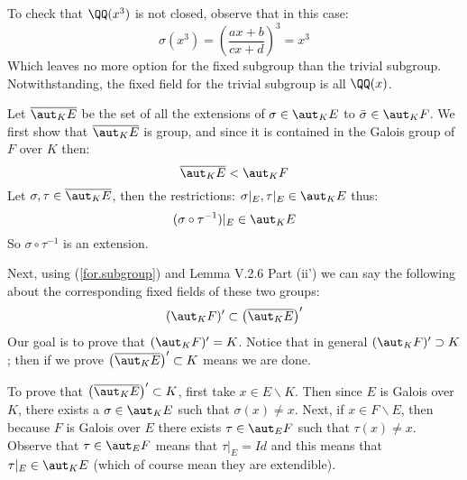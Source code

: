 To check that $\QQ(x^3)$ is not closed, observe that in this case:
$$\sigma(x^3) = \left( \frac{ax+b}{cx+d}\right)^3=x^3$$
Which leaves no more option for the fixed subgroup than the trivial subgroup. Notwithstanding, the fixed field for the trivial subgroup is all $\QQ(x)$.

Let $\overline{\aut_K E}$ be the set of all the extensions of $\sigma\in \aut_KE$ to $\bar\sigma\in \aut_KF$. We first show that $\overline{\aut_K E}$ is group, and since it is contained in the Galois group of $F$ over $K$ then:
\begin{equation}\label{for.subgroup}
\overline{\aut_K E}<\aut_KF
\end{equation}
Let $\sigma, \tau \in \overline{\aut_K E}$, then the restrictions: $\sigma|_E,\tau|_E\in \aut_KE$ thus:
$$(\sigma\circ\tau^{-1})|_E\in \aut_KE$$
So $\sigma\circ\tau^{-1}$ is an extension.

Next, using (\ref{for.subgroup}) and Lemma V.2.6 Part (ii') we can say the following about the corresponding fixed fields of these two groups:
$$(\aut_KF)' \subset \left(\overline{\aut_K E}\right)'$$
Our goal is to prove that $(\aut_KF)'=K$. Notice that in general $(\aut_KF)'\supset K$; then if we prove $\left(\overline{\aut_K E}\right)'\subset K$ means we are done.

To prove that $\left(\overline{\aut_K E}\right)'\subset K$, first take $x\in E\backslash K$. Then since $E$ is Galois over $K$, there exists a $\sigma\in \aut_KE$ such that $\sigma(x)\neq x$. Next, if $x\in F\backslash E$, then because $F$ is Galois over $E$ there exists $\tau\in \aut_EF$ such that $\tau(x)\neq x$. Observe that $\tau\in \aut_EF$ means that $\tau|_E= Id$ and this means that $\tau|_E\in \aut_KE$ (which of course mean they are extendible).
